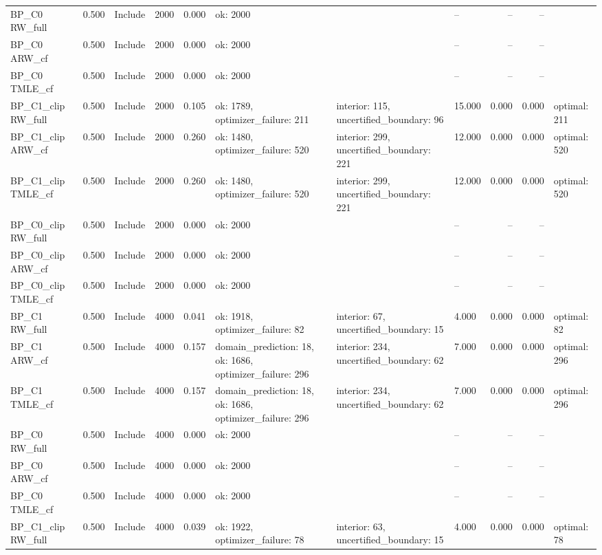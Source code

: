 \begin{tabular}{llllrlllrrl}
BP\_C0 RW\_full & 0.500 & Include & 2000 & 0.000 & ok: 2000 &  & -- & -- & -- &  \\
BP\_C0 ARW\_cf & 0.500 & Include & 2000 & 0.000 & ok: 2000 &  & -- & -- & -- &  \\
BP\_C0 TMLE\_cf & 0.500 & Include & 2000 & 0.000 & ok: 2000 &  & -- & -- & -- &  \\
BP\_C1\_clip RW\_full & 0.500 & Include & 2000 & 0.105 & ok: 1789, optimizer\_failure: 211 & interior: 115, uncertified\_boundary: 96 & 15.000 & 0.000 & 0.000 & optimal: 211 \\
BP\_C1\_clip ARW\_cf & 0.500 & Include & 2000 & 0.260 & ok: 1480, optimizer\_failure: 520 & interior: 299, uncertified\_boundary: 221 & 12.000 & 0.000 & 0.000 & optimal: 520 \\
BP\_C1\_clip TMLE\_cf & 0.500 & Include & 2000 & 0.260 & ok: 1480, optimizer\_failure: 520 & interior: 299, uncertified\_boundary: 221 & 12.000 & 0.000 & 0.000 & optimal: 520 \\
BP\_C0\_clip RW\_full & 0.500 & Include & 2000 & 0.000 & ok: 2000 &  & -- & -- & -- &  \\
BP\_C0\_clip ARW\_cf & 0.500 & Include & 2000 & 0.000 & ok: 2000 &  & -- & -- & -- &  \\
BP\_C0\_clip TMLE\_cf & 0.500 & Include & 2000 & 0.000 & ok: 2000 &  & -- & -- & -- &  \\
BP\_C1 RW\_full & 0.500 & Include & 4000 & 0.041 & ok: 1918, optimizer\_failure: 82 & interior: 67, uncertified\_boundary: 15 & 4.000 & 0.000 & 0.000 & optimal: 82 \\
BP\_C1 ARW\_cf & 0.500 & Include & 4000 & 0.157 & domain\_prediction: 18, ok: 1686, optimizer\_failure: 296 & interior: 234, uncertified\_boundary: 62 & 7.000 & 0.000 & 0.000 & optimal: 296 \\
BP\_C1 TMLE\_cf & 0.500 & Include & 4000 & 0.157 & domain\_prediction: 18, ok: 1686, optimizer\_failure: 296 & interior: 234, uncertified\_boundary: 62 & 7.000 & 0.000 & 0.000 & optimal: 296 \\
BP\_C0 RW\_full & 0.500 & Include & 4000 & 0.000 & ok: 2000 &  & -- & -- & -- &  \\
BP\_C0 ARW\_cf & 0.500 & Include & 4000 & 0.000 & ok: 2000 &  & -- & -- & -- &  \\
BP\_C0 TMLE\_cf & 0.500 & Include & 4000 & 0.000 & ok: 2000 &  & -- & -- & -- &  \\
BP\_C1\_clip RW\_full & 0.500 & Include & 4000 & 0.039 & ok: 1922, optimizer\_failure: 78 & interior: 63, uncertified\_boundary: 15 & 4.000 & 0.000 & 0.000 & optimal: 78 \\

\end{tabular}
